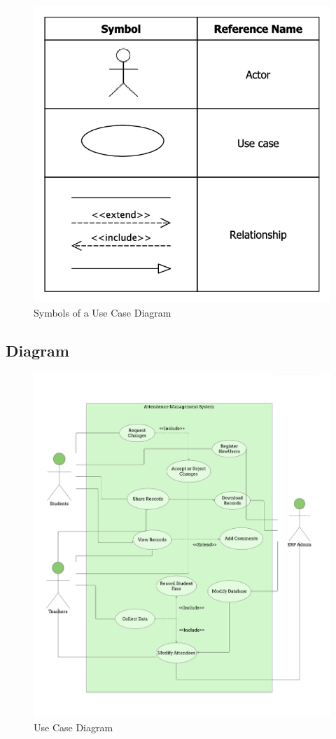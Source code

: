\documentclass[11pt]{article}
\begin{document}
\begin{figure}[H]
	\centering
	\includegraphics[scale=0.35]{Symbols-of-use-case-diagrams.png}
	\caption{Symbols of a Use Case Diagram}
\end{figure}

\clearpage

\subsection{Diagram}

\begin{figure}[H]
	\centering
	\includegraphics[scale=0.20]{use_case.png}
	\caption{Use Case Diagram}
\end{figure}
\end{document}
